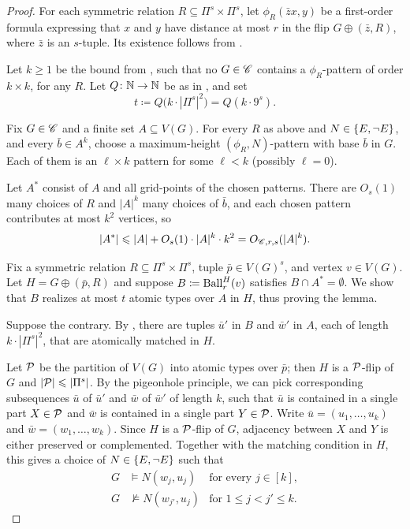 \lemBallTypes*
\begin{proof}
    For each symmetric relation $R\subseteq\Pi^s \times \Pi^s$, let $\phi_R(\bar z x,y)$ be a first-order formula expressing that $x$ and $y$ have distance at most $r$ in the flip $G\oplus(\bar z,R)$, where $\bar z$ is an $s$-tuple.
Its existence follows from .

Let $k\ge 1$ be the bound from 
     , such that no $G\in\mathscr C$ contains a $\phi_R$-pattern of order $k\times k$, for any $R$.
    Let $Q\colon\mathbb N\to\mathbb N$ be as in , and set
    \[
        t\coloneqq Q\big(k \cdot |\Pi^s|^2\big)=Q(k\cdot 9^s).
    \]

    Fix $G\in\mathscr C$ and a finite set $A\subseteq V(G)$.
    For every $R$ as above and $N\in \{E,\neg E\}$, and every $\bar b\in A^k$, choose a maximum-height $(\phi_R,N)$-pattern with base $\bar b$ in $G$. Each of them is an $\ell\times k$ pattern for some $\ell<k$ (possibly $\ell=0$).
    
    Let $A^*$ consist of $A$ and all grid-points of the chosen patterns.
    There are $O_s(1)$ many choices of $R$ and $|A|^k$ many choices of $\bar b$, and each chosen pattern contributes at most $k^2$ vertices, so
    \[
        |A^*|\leqslant |A|+O_s(1)\cdot|A|^k\cdot k^2
        =O_{\mathscr C,r,s}(|A|^k).
    \]

    Fix a symmetric relation $R\subseteq\Pi^s \times \Pi^s$, tuple $\bar p \in V(G)^s$, and vertex $v \in V(G)$. Let
    $H=G\oplus(\bar p,R)$ and suppose $B\coloneqq \operatorname{Ball}_r^H(v)$ satisfies $B\cap A^*=\emptyset$.
    We show that $B$ realizes at most $t$ atomic types over $A$ in $H$, thus proving the lemma.
    
    Suppose the contrary.
    By , there are tuples $\bar u'$ in $B$ and $\bar w'$ in $A$, each of length $k \cdot |\Pi^s|^2$, that are atomically matched in $H$.

    Let $\mathcal P$ be the partition of $V(G)$ into atomic types over $\bar p$; then $H$ is a $\mathcal P$-flip of $G$ and $|\mathcal P|\leqslant |\Pi^s|$.
    By the pigeonhole principle, we can pick corresponding subsequences $\bar u$ of $\bar u'$ and $\bar w$ of $\bar w'$ of length $k$,
    such that $\bar u$ 
    is contained in a single part $X\in \mathcal P$
    and $\bar w$ is contained in a single part $Y\in\mathcal P$.
    Write $\bar u=(u_1,\ldots,u_k)$ and $\bar w=(w_1,\ldots,w_k)$.
    Since $H$ is a $\mathcal P$-flip of $G$, adjacency between $X$ and $Y$ is either preserved or complemented.
    Together with the matching condition in $H$, this gives a choice of $N\in\{E,\neg E\}$ such that
    \[
        \begin{aligned}
            G&\models N(w_j,u_j)&\text{for every }j\in[k],\\
            G&\not\models N(w_{j'},u_j)&\text{for }1\le j<j'\le k.
        \end{aligned}
    \]
    

\end{proof}
